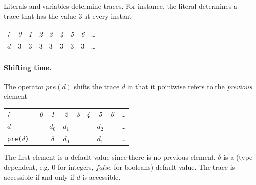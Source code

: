 Literals and variables determine traces. For instance, the literal  determines a trace that has the value $3$ at every instant
\begin{center}
  \leavevmode
  \begin{tabular}[]{l@{\quad}||@{\quad} cccccccc}
    \hline\hline
     \hbox{{\footnotesize \textit{i}}} &{\footnotesize \textit{0}}
     &{\footnotesize \textit{1}}&{\footnotesize \textit{2}}
     &{\footnotesize \textit{3}}&{\footnotesize \textit{4}}
     &{\footnotesize \textit{5}}&{\footnotesize \textit{6}}&\ldots
   \\  
     \hbox{$d$} &$3$&$3$&$3$&$3$&$3$&$3$&$3$&\ldots
   \\
   \hline\hline
  \end{tabular}
\end{center}


\paragraph{Shifting time.}
The operator $pre(d)$ shifts the trace $d$ in that it pointwise refers
to the \emph{previous} element 
\begin{center}
  \leavevmode
  \begin{tabular}[]{l@{}||@{\quad} cccccccc}
    \hline\hline
     \hbox{{\footnotesize \textit{i}}} &{\footnotesize \textit{0}}
     &{\footnotesize \textit{1}}&{\footnotesize \textit{2}}
     &{\footnotesize \textit{3}}&{\footnotesize \textit{4}}
     &{\footnotesize \textit{5}}&{\footnotesize \textit{6}}&\ldots
   \\  

    \hbox{$d$ \quad} &&$d_0$&$d_1$&&&$d_2$&&\ldots
   \\
    \hbox{\texttt{pre($d$)} \quad}  
    &&$\delta$&$d_0$&&&$d_1$&&\ldots
   \\
   \hline\hline
  \end{tabular}
\end{center}
The first element is a default value since there is no previous element. $\delta$ is a (type dependent, e.g. $0$ for integers, $false$ 
for booleans) default value. The trace  is accessible if and only if $d$ is accessible.

